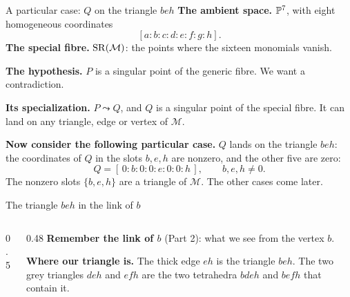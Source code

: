 \begin{frame}{A particular case: \(Q\) on the triangle \(beh\)}
\textbf{The ambient space.} \(\mathbb P^7\), with eight homogeneous coordinates
\[
[a:b:c:d:e:f:g:h].
\]
\textbf{The special fibre.} \(\operatorname{SR}(\mathcal M)\): the points where the sixteen monomials vanish.
\par\medskip
\textbf{The hypothesis.} \(P\) is a singular point of the generic fibre. We want a contradiction.
\par\medskip
\textbf{Its specialization.} \(P\leadsto Q\), and \(Q\) is a singular point of the special fibre. It can land on any triangle, edge or vertex of \(\mathcal M\).
\par\medskip
\textbf{Now consider the following particular case.} \(Q\) lands on the triangle \(beh\): the coordinates of \(Q\) in the slots \(b,e,h\) are nonzero, and the other five are zero:
\[
\boxed{Q=[\,0:b:0:0:e:0:0:h\,],\qquad b,e,h\ne0.}
\]
The nonzero slots \(\{b,e,h\}\) are a triangle of \(\mathcal M\). The other cases come later.
\end{frame}

\begin{frame}{The triangle \(beh\) in the link of \(b\)}
\begin{columns}[c]
\begin{column}{0.5\textwidth}
\centering
{}
\end{column}
\begin{column}{0.48\textwidth}
\textbf{Remember the link of \(b\)} (Part 2): what we see from the vertex \(b\).
\par\medskip
\textbf{Where our triangle is.} The thick edge \(eh\) is the triangle \(beh\). The two grey triangles \(deh\) and \(efh\) are the two tetrahedra \(bdeh\) and \(befh\) that contain it.
\end{column}
\end{columns}
\end{frame}

